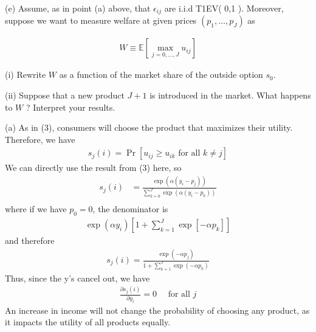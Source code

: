 {(e) Assume, as in point (a) above, that $\epsilon_{i j}$ are i.i.d T1EV( 0,1 ). Moreover, suppose we want to measure welfare at given prices $\left(p_1, \ldots, p_J\right)$ as

\begin{align*}
W \equiv \mathbb{E}\left[\max _{j=0, \ldots, J} u_{i j}\right]
\end{align*}

(i) Rewrite $W$ as a function of the market share of the outside option $s_0$.

(ii) Suppose that a new product $J+1$ is introduced in the market. What happens to $W$ ? Interpret your results.

}

(a)
As in (3), consumers will choose the product that maximizes their utility. Therefore, we have
\begin{align*}
s_j(i)=\operatorname{Pr}\left[u_{i j} \geq u_{i k} \text { for all } k \neq j\right]
\end{align*}
We can directly use the result from (3) here, so
\begin{align*}
s_j(i)&=\frac{\exp \left(\alpha\left(y_i-p_j\right)\right)}{\sum_{k=0}^J \exp \left(\alpha\left(y_i-p_{k}\right)\right)} \\
\end{align*}
where if we have $p_0=0$, the denominator is
\begin{align*}
\exp \left(\alpha y_i\right)\left[1+\sum_{k=1}^J \exp \left[-\alpha p_{k}\right]\right]
\end{align*}
and therefore
\begin{align*}
s_j(i)=\frac{\exp \left(-\alpha p_j\right)}{1+\sum_{k=1}^J \exp \left(-\alpha p_k\right)}
\end{align*}
Thus, since the y's cancel out, we have
\begin{align*}
\frac{\partial s_j(i)}{\partial y_i}=0 \quad \text { for all } j
\end{align*}
An increase in income will not change the probability of choosing any product,
as it impacts the utility of all products equally.


